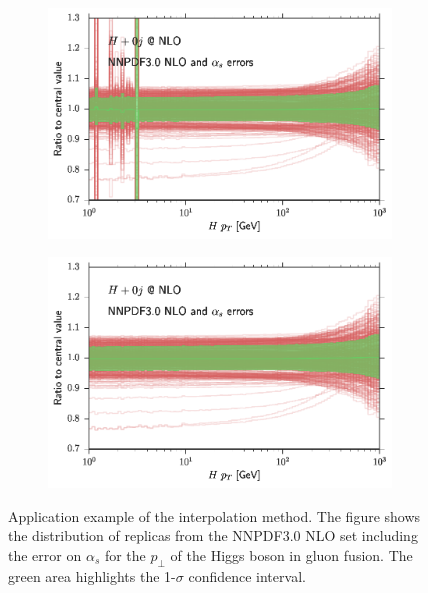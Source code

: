 \begin{figure}
	\centering
	\begin{subfigure}[]{0.49\textwidth}
		\includegraphics[width=\textwidth]{images/nnpdf_band_appl.pdf}
		\caption{\appl{}}
	\end{subfigure}
	\hfill
	\begin{subfigure}[]{0.49\textwidth}
		\includegraphics[width=\textwidth]{images/nnpdf_band_fnlo.pdf}
		\caption{\fnlo{}}
	\end{subfigure}
	\caption{Application example of the interpolation method.
				The figure shows the distribution of replicas from the NNPDF3.0 NLO set including the error on $\alpha_s$ for the $p_\perp$ of the Higgs boson in gluon fusion.
				The green area highlights the 1-$\sigma$ confidence interval.}
	\label{fig:nnpdf_band}
\end{figure}
%
